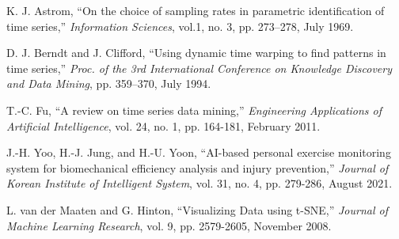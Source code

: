 \documentclass{ISIS}
\begin{document}
\begin{reference}
 K. J. Astrom, ``On the choice of sampling rates in parametric identification of time series,'' \textit{Information Sciences}, vol.1, no. 3, pp. 273–278, July 1969.

 D. J. Berndt and J. Clifford, ``Using dynamic time warping to find patterns in time series,'' \textit{Proc. of the 3rd International Conference on Knowledge Discovery and Data Mining}, pp. 359–370, July 1994.

 T.-C. Fu, ``A review on time series data mining,'' \textit{Engineering Applications of Artificial Intelligence}, vol. 24, no. 1, pp. 164-181, February 2011. 

 J.-H. Yoo, H.-J. Jung, and H.-U. Yoon, ``AI-based personal exercise monitoring system for biomechanical efficiency analysis and injury prevention,'' \textit{Journal of Korean Institute of Intelligent System}, vol. 31, no. 4, pp. 279-286, August 2021. 

 L. van der Maaten and G. Hinton, ``Visualizing Data using t-SNE,'' \textit{Journal of Machine Learning Research}, vol. 9, pp. 2579-2605, November 2008. 








\end{reference}
\end{document}
